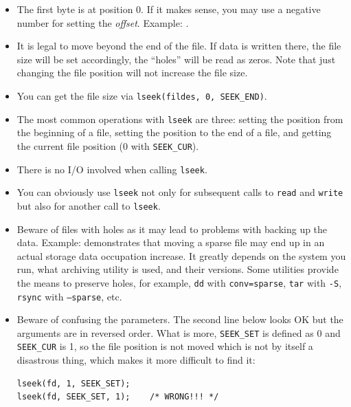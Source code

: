 \begin{itemize}
\item \label{LSEEK} The first byte is at position 0.  If it makes sense, you may
use a negative number for setting the \emph{offset}.  Example:
.
\item It is legal to move beyond the end of the file.  If data is written there,
the file size will be set accordingly, the ``holes'' will be read as zeros.
Note that just changing the file position will not increase the file size.
\item You can get the file size via \texttt{lseek(fildes, 0, SEEK\_END)}.
\item The most common operations with \texttt{lseek} are three: setting the
position from the beginning of a file, setting the position to the end of a
file, and getting the current file position (0 with \texttt{SEEK\_CUR}).
\item There is no I/O involved when calling \texttt{lseek}.
\item You can obviously use \texttt{lseek} not only for subsequent calls to
\texttt{read} and \texttt{write} but also for another call to \texttt{lseek}.
\item \label{BIG_FILE} Beware of files with holes as it may lead to problems
with backing up the data.  Example:  demonstrates that
moving a sparse file may end up in an actual storage data occupation increase.
It greatly depends on the system you run, what archiving utility is used, and
their versions.  Some utilities provide the means to preserve holes, for example,
\texttt{dd} with \texttt{conv=sparse}, \texttt{tar} with \texttt{-S},
\texttt{rsync} with \texttt{--sparse}, etc.
\item Beware of confusing the parameters.  The second line below looks OK but
the arguments are in reversed order.  What is more, \texttt{SEEK\_SET} is
defined as 0 and \texttt{SEEK\_CUR} is 1, so the file position is not moved
which is not by itself a disastrous thing, which makes it more difficult to find
it:

\begin{verbatim}
lseek(fd, 1, SEEK_SET);
lseek(fd, SEEK_SET, 1);    /* WRONG!!! */
\end{verbatim}
\end{itemize}



